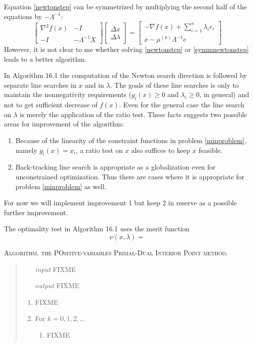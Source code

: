 \documentclass[11pt]{article}
\newcommand{\grad}{\nabla}
\begin{document}
Equation \eqref{newtonstep} can be symmetrized by multiplying the second half of the equations by $-\Lambda^{-1}$:
\begin{equation}
\begin{bmatrix}
\grad^2 f(x) & - I \\
-I & - \Lambda^{-1} X
\end{bmatrix}
\begin{bmatrix}
\Delta x \\
\Delta \lambda
\end{bmatrix}
=
\begin{bmatrix}
-\grad f(x) + \sum_{i=1}^n \lambda_i e_i \\
x - \mu^{(k)} \Lambda^{-1} e
\end{bmatrix}
 \label{symmnewtonstep}
\end{equation}
However, it is not clear to me whether solving \eqref{newtonstep} or \eqref{symmnewtonstep} leads to a better algorithm.

In Algorithm 16.1 the computation of the Newton search direction is followed by separate line searches in $x$ and in $\lambda$.  The goals of these line searches is only to maintain the nonnegativity requirements ($g_i(x)\ge 0$ and $\lambda_i\ge 0$, in general) and not to get sufficient decrease of $f(x)$.  Even for the general case the line search on $\lambda$ is merely the application of the ratio test.  These facts suggests two possible areas for improvement of the algorithm:
\begin{enumerate}
\item Because of the linearity of the constraint functions in problem \eqref{minproblem}, namely $g_i(x)=x_i$, a ratio test on $x$ also suffices to keep $x$ feasible.
\item Back-tracking line search is appropriate as a globalization even for unconstrained optimization.  Thus there are cases where it is appropriate for problem \eqref{minproblem} as well.
\end{enumerate}
For now we will implement improvement 1 but keep 2 in reserve as a possible further improvement.

The optimality test in Algorithm 16.1 uses the merit function
    $$\nu(x,\lambda) = $$

\bigskip
\noindent \textsc{Algorithm. the POsitive-variables Primal-Dual Interior Point method.}
\begin{quote}
\begin{itemize}
\item[\emph{input}]  FIXME
\item[\emph{output}]  FIXME
\end{itemize}
\renewcommand{\labelenumi}{\arabic{enumi}.}
\begin{enumerate}
\item FIXME
\item For $k=0,1,2,\dots$
    \renewcommand{\labelenumii}{(\alph{enumii})}
    \begin{enumerate}
    \item FIXME
    \end{enumerate}
\end{enumerate}
\end{quote}




\end{document}
